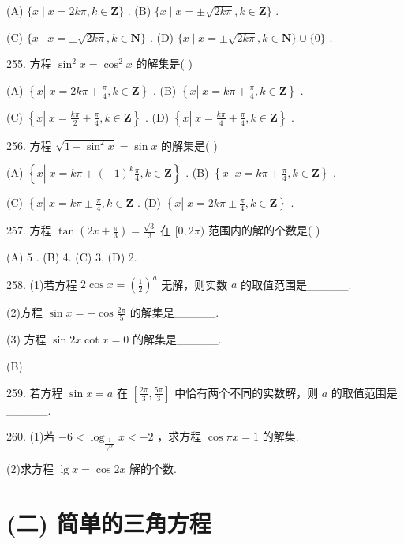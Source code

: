 \documentclass[10pt]{article}
\begin{document}
(A) \(\{ x \mid  x = {2k\pi },k \in  \mathbf{Z}\}\) . (B) \(\{ x \mid  x =  \pm  \sqrt{2k\pi },k \in  \mathbf{Z}\}\) .

(C) \(\{ x \mid  x =  \pm  \sqrt{2k\pi },k \in  \mathbf{N}\}\) . (D) \(\{ x \mid  x =  \pm  \sqrt{2k\pi },k \in  \mathbf{N}\}  \cup  \{ 0\}\) .

255. 方程 \({\sin }^{2}x = {\cos }^{2}x\) 的解集是( )

(A) \(\left\{  {x\left| {\;x = {2k\pi } + \frac{\pi }{4}}\right. ,k \in  \mathbf{Z}}\right\}\) . (B) \(\left\{  {x\left| {\;x = {k\pi } + \frac{\pi }{4}}\right. ,k \in  \mathbf{Z}}\right\}\) .

(C) \(\left\{  {x\left| {\;x = \frac{k\pi }{2} + \frac{\pi }{4}}\right. ,k \in  \mathbf{Z}}\right\}\) . (D) \(\left\{  {x\left| {\;x = \frac{k\pi }{4} + \frac{\pi }{4}}\right. ,k \in  \mathbf{Z}}\right\}\) .

256. 方程 \(\sqrt{1 - {\sin }^{2}x} = \sin x\) 的解集是( )

(A) \(\left\{  {x\left| {\;x = {k\pi } + {\left( -1\right) }^{k}\frac{\pi }{4}}\right. ,k \in  \mathbf{Z}}\right\}\) . (B) \(\left\{  {x\left| {\;x = {k\pi } + \frac{\pi }{4}}\right. ,k \in  \mathbf{Z}}\right\}\) .

(C) \(\left\{  {x\left| {\;x = {k\pi } \pm  \frac{\pi }{4}}\right. ,k \in  \mathbf{Z}}\right.\) . (D) \(\left\{  {x\left| {\;x = {2k\pi } \pm  \frac{\pi }{4}}\right. ,k \in  \mathbf{Z}}\right\}\) .

257. 方程 \(\tan \left( {{2x} + \frac{\pi }{3}}\right)  = \frac{\sqrt{3}}{3}\) 在 \(\lbrack 0,{2\pi })\) 范围内的解的个数是( )

(A) 5 . (B) 4. (C) 3. (D) 2.

258. (1)若方程 \(2\cos x = {\left( \frac{1}{2}\right) }^{a}\) 无解，则实数 \(a\) 的取值范围是\_\_\_\_\_.

(2)方程 \(\sin x =  - \cos \frac{2\pi }{5}\) 的解集是\_\_\_\_\_.

(3) 方程 \(\sin {2x}\cot x = 0\) 的解集是\_\_\_\_\_.

(B)

259. 若方程 \(\sin x = a\) 在 \(\left\lbrack  {\frac{2\pi }{3},\frac{5\pi }{3}}\right\rbrack\) 中恰有两个不同的实数解，则 \(a\) 的取值范围是\_\_\_\_\_.

260. (1)若 \(- 6 < {\log }_{\frac{1}{\sqrt{2}}}x <  - 2\) ，求方程 \(\cos {\pi x} = 1\) 的解集.

(2)求方程 \(\lg x = \cos {2x}\) 解的个数.

\section*{(二) 简单的三角方程}
\end{document}
